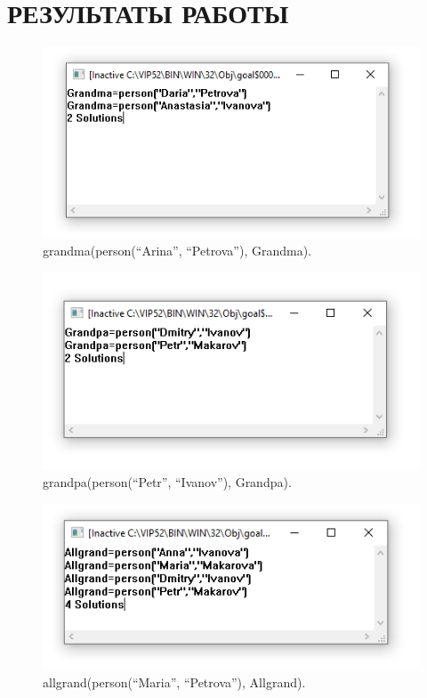 \section{РЕЗУЛЬТАТЫ РАБОТЫ}

\begin{figure}[H]
    \centering
    \includegraphics[scale=0.8]{img/1.png}
    \caption{grandma(person(``Arina'', ``Petrova''), Grandma).}
\end{figure}

\begin{figure}[H]
    \centering
    \includegraphics[scale=0.8]{img/2.png}
    \caption{grandpa(person(``Petr'', ``Ivanov''), Grandpa).}
\end{figure}

\begin{figure}[H]
    \centering
    \includegraphics[scale=0.8]{img/3.png}
    \caption{allgrand(person(``Maria'', ``Petrova''), Allgrand).}
\end{figure}

